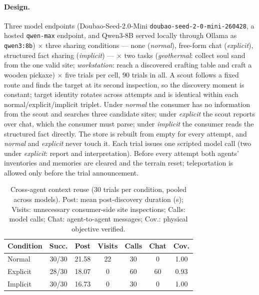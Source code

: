 \documentclass[letterpaper]{article} %
\begin{document}
\paragraph{Design.}  Three model endpoints (Doubao-Seed-2.0-Mini
\texttt{doubao-seed-2-0-mini-260428}, a hosted \texttt{qwen-max} endpoint, and
Qwen3-8B served locally through Ollama as \texttt{qwen3:8b}) $\times$ three
sharing conditions --- none (\emph{normal}), free-form chat
(\emph{explicit}), structured fact sharing (\emph{implicit}) --- $\times$ two
tasks (\emph{geothermal}: collect soul sand from the one valid site;
\emph{workstation}: reach a discovered crafting table and craft a wooden
pickaxe) $\times$ five trials per cell, 90 trials in all.  A scout follows a
fixed route and finds the target at its second inspection, so the discovery
moment is constant; target identity rotates across attempts and is identical
within each normal/explicit/implicit triplet.  Under \emph{normal} the consumer
has no information from the scout and searches three candidate sites; under
\emph{explicit} the scout reports over chat, which the consumer must parse;
under \emph{implicit} the consumer reads the structured fact directly.  The
store is rebuilt from empty for every attempt, and \emph{normal} and
\emph{explicit} never touch it.  Each trial issues one scripted model call (two
under \emph{explicit}: report and interpretation).  Before every attempt both
agents' inventories and memories are cleared and the terrain reset;
teleportation is allowed only before the trial announcement.

\begin{table}[htbp]
\caption{Cross-agent context reuse (30 trials per condition, pooled across
models).  Post: mean post-discovery duration (s); Visits: unnecessary
consumer-side site inspections; Calls: model calls; Chat: agent-to-agent
messages; Cov.: physical objective verified.}
\label{tab:multiagent}
\small\renewcommand{\arraystretch}{1.1}\setlength{\tabcolsep}{6pt}
\centering
\begin{tabular}{lcccccc}
\toprule
Condition & Succ. & Post & Visits & Calls & Chat & Cov. \\
\midrule
Normal   & 30/30 & 21.58 & 22 & 30 & 0  & 1.00 \\
Explicit & 28/30 & 18.07 & 0  & 60 & 60 & 0.93 \\
Implicit & 30/30 & 16.73 & 0  & 30 & 0  & 1.00 \\
\bottomrule
\end{tabular}
\renewcommand{\arraystretch}{1}
\end{table}
\end{document}
